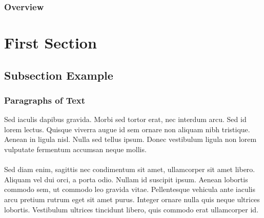 \documentclass{beamer}
\begin{document}
\begin{frame}
\frametitle{Overview} %
\tableofcontents %
\end{frame}


\section{First Section} %

\subsection{Subsection Example} %

\begin{frame}
\frametitle{Paragraphs of Text}
Sed iaculis dapibus gravida. Morbi sed tortor erat, nec interdum arcu. Sed id lorem lectus. Quisque viverra augue id sem ornare non aliquam nibh tristique. Aenean in ligula nisl. Nulla sed tellus ipsum. Donec vestibulum ligula non lorem vulputate fermentum accumsan neque mollis.\\~\\

Sed diam enim, sagittis nec condimentum sit amet, ullamcorper sit amet libero. Aliquam vel dui orci, a porta odio. Nullam id suscipit ipsum. Aenean lobortis commodo sem, ut commodo leo gravida vitae. Pellentesque vehicula ante iaculis arcu pretium rutrum eget sit amet purus. Integer ornare nulla quis neque ultrices lobortis. Vestibulum ultrices tincidunt libero, quis commodo erat ullamcorper id.
\end{frame}
\end{document}
